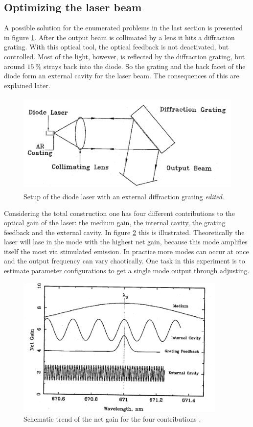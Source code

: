 \subsection{Optimizing the laser beam}
\label{sec:Optimizing}

A possible solution for the enumerated problems in the last section is presented in figure \ref{fig:diffraction}.
After the output beam is collimated by a lens it hits a diffraction grating. With this optical tool, the optical
feedback is not deactivated, but controlled. Most of the light, however, is reflected by the diffraction grating,
but around $\SI{15}{\percent}$ strays back into the diode. So the grating and the back facet of the diode form
an external cavity for the laser beam. The consequences of this are explained later.

\begin{figure}
  \centering
  \includegraphics[height=5cm]{Ordnername/diffraction_edit.pdf}
  \caption{Setup of the diode laser with an external diffraction grating \cite{manual} \textit{edited}.}
  \label{fig:diffraction}
\end{figure}

Considering the total construction one has four different contributions to the optical gain of the laser:
the medium gain, the internal cavity, the grating feedback and the external cavity.
In figure \ref{fig:optgain} this is illustrated. Theoretically the laser will lase in the mode with the
highest net gain, because this mode amplifies itself the most via stimulated emission. In practice more
modes can occur at once and the output frequency can vary chaotically. One task in this experiment is to
estimate parameter configurations to get a single mode output through adjusting.

\begin{figure}
  \centering
  \includegraphics[height=7cm]{Ordnername/optgain.png}
  \caption{Schematic trend of the net gain for the four contributions \cite{manual}.}
  \label{fig:optgain}
\end{figure}

